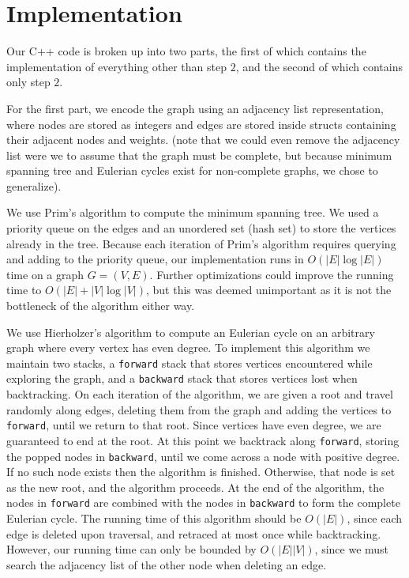\documentclass{article}
\begin{document}
\section{Implementation}

Our C++ code is broken up into two parts, the first of which contains the implementation of everything other than step $2$, and the second of which contains only step $2$.

For the first part, we encode the graph using an adjacency list representation, where nodes are stored as integers and edges are stored inside structs containing their adjacent nodes and weights. (note that we could even remove the adjacency list were we to assume that the graph must be complete, but because minimum spanning tree and Eulerian cycles exist for non-complete graphs, we chose to generalize).

We use Prim's algorithm to compute the minimum spanning tree. We used a priority queue on the edges and an unordered set (hash set) to store the vertices already in the tree. Because each iteration of Prim's algorithm requires querying and adding to the priority queue, our implementation runs in $O(|E| \log |E|)$ time on a graph $G = (V, E)$. Further optimizations could improve the running time to $O(|E| + |V|\log |V|)$, but this was deemed unimportant as it is not the bottleneck of the algorithm either way.

We use Hierholzer's algorithm to compute an Eulerian cycle on an arbitrary graph where every vertex has even degree. To implement this algorithm we maintain two stacks, a \texttt{forward} stack that stores vertices encountered while exploring the graph, and a \texttt{backward} stack that stores vertices lost when backtracking. On each iteration of the algorithm, we are given a root and travel randomly along edges, deleting them from the graph and adding the vertices to \texttt{forward}, until we return to that root. Since vertices have even degree, we are guaranteed to end at the root. At this point we backtrack along \texttt{forward}, storing the popped nodes in \texttt{backward}, until we come across a node with positive degree. If no such node exists then the algorithm is finished. Otherwise, that node is set as the new root, and the algorithm proceeds. At the end of the algorithm, the nodes in \texttt{forward} are combined with the nodes in \texttt{backward} to form the complete Eulerian cycle. The running time of this algorithm should be $O(|E|)$, since each edge is deleted upon traversal, and retraced at most once while backtracking. However, our running time can only be bounded by $O(|E||V|)$, since we must search the adjacency list of the other node when deleting an edge.
\end{document}
